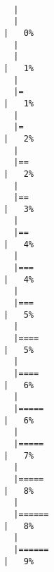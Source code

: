 \documentclass[12pt]{article}
\begin{document}
\begin{verbatim}

  |                                                                            
  |                                                                      |   0%
  |                                                                            
  |                                                                      |   1%
  |                                                                            
  |=                                                                     |   1%
  |                                                                            
  |=                                                                     |   2%
  |                                                                            
  |==                                                                    |   2%
  |                                                                            
  |==                                                                    |   3%
  |                                                                            
  |==                                                                    |   4%
  |                                                                            
  |===                                                                   |   4%
  |                                                                            
  |===                                                                   |   5%
  |                                                                            
  |====                                                                  |   5%
  |                                                                            
  |====                                                                  |   6%
  |                                                                            
  |=====                                                                 |   6%
  |                                                                            
  |=====                                                                 |   7%
  |                                                                            
  |=====                                                                 |   8%
  |                                                                            
  |======                                                                |   8%
  |                                                                            
  |======                                                                |   9%

\end{verbatim}
\end{document}
